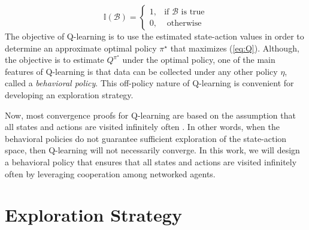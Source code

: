 \documentclass[lettersize,journal]{IEEEtran}
\begin{document}
\[ \mathbb{I}(\mathcal{B})=
   \begin{cases} 
      1, & \text{if }\mathcal{B} \text{ is true}\\
      0, & \text{ otherwise} 
   \end{cases}
\]
 The objective of Q-learning is to use the estimated state-action values in order to determine an approximate optimal policy $\pi^{\star}$ that maximizes (\ref{eq:Q}). %
 Although, the objective is to estimate $Q^{\pi^{\star}}$ under the optimal policy, one of the main features of Q-learning is that data can be collected under any other policy $\eta$,  called a {\em behavioral policy}. This off-policy nature  of Q-learning is convenient for developing an exploration strategy.   \par 
Now, most convergence proofs for Q-learning are based on the assumption that all states and actions are visited infinitely often \cite{Watkins,SA}.  In other words, when the behavioral policies do not guarantee sufficient exploration of the state-action space, then Q-learning will not necessarily converge. In this work, we will design a behavioral policy that ensures that all states and actions are visited infinitely often by leveraging cooperation among networked agents. 



\section{Exploration Strategy}
\label{sec:exploration}
\end{document}
